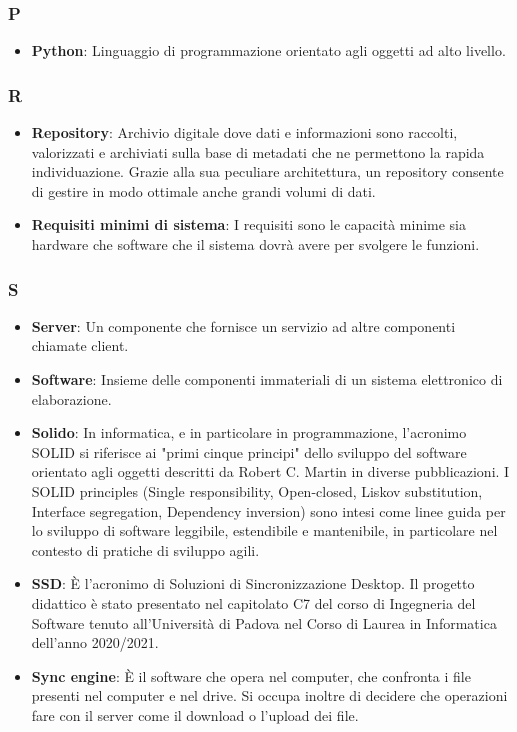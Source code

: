 \subsubsection*{P}
\begin{itemize}
    \item \textbf{Python}: Linguaggio di programmazione orientato agli oggetti ad alto livello.
\end{itemize}

\subsubsection*{R}
\begin{itemize}
    \item \textbf{Repository}: Archivio digitale dove dati e informazioni sono raccolti, valorizzati e archiviati sulla base di metadati che ne permettono la rapida individuazione. Grazie alla sua peculiare architettura, un repository consente di gestire in modo ottimale anche grandi volumi di dati.
    \item \textbf{Requisiti minimi di sistema}: I requisiti sono le capacità minime sia hardware che software che il sistema dovrà avere per svolgere le funzioni.
\end{itemize}

\subsubsection*{S}
\begin{itemize}
    \item \textbf{Server}: Un componente che fornisce un servizio ad altre componenti chiamate client.
    \item \textbf{Software}: Insieme delle componenti immateriali di un sistema elettronico di elaborazione.
    \item \textbf{Solido}: In informatica, e in particolare in programmazione, l'acronimo SOLID si riferisce ai "primi cinque principi" dello sviluppo del software orientato agli oggetti descritti da Robert C. Martin in diverse pubblicazioni. I SOLID principles (Single responsibility, Open-closed, Liskov substitution, Interface segregation, Dependency inversion) sono intesi come linee guida per lo sviluppo di software leggibile, estendibile e mantenibile, in particolare nel contesto di pratiche di sviluppo agili.
    \item \textbf{SSD}: È l'acronimo di Soluzioni di Sincronizzazione Desktop. Il progetto didattico è stato presentato nel capitolato C7 del corso di Ingegneria del Software tenuto all'Università di Padova nel Corso di Laurea in Informatica dell'anno 2020/2021.
    \item \textbf{Sync engine}: È il software che opera nel computer, che confronta i file presenti nel computer e nel drive. Si occupa inoltre di decidere che operazioni fare con il server come il download o l'upload dei file.
\end{itemize}

